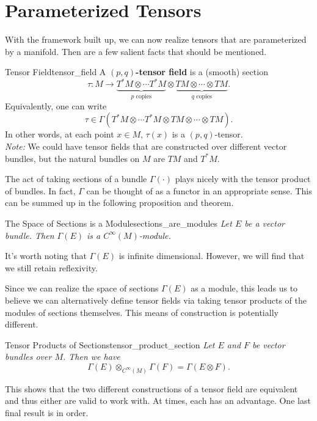 \section{Parameterized Tensors}

With the framework built up, we can now realize tensors that are parameterized by a manifold.  Then are a few salient facts that should be mentioned.

\begin{df}{Tensor Field}{tensor_field}
A \textbf{$(p,q)$-tensor field} is a (smooth) section
\[
\tau \colon M \to \underbrace{T^*M\otimes \cdots T^*M}_{\textrm{$p$ copies}} \otimes \underbrace{TM\otimes \cdots \otimes TM}_{\textrm{$q$ copies}}.
\]
Equivalently, one can write
\[
\tau \in \Gamma(T^*M\otimes \cdots T^*M\otimes TM \otimes \cdots \otimes TM).
\]
In other words, at each point $x\in M$, $\tau(x)$ is a $(p,q)$-tensor.\\

\emph{Note:} We could have tensor fields that are constructed over different vector bundles, but the natural bundles on $M$ are $TM$ and $T^*M$.
\end{df}

The act of taking sections of a bundle $\Gamma(\cdot)$ plays nicely with the tensor product of bundles.  In fact, $\Gamma$ can be thought of as a functor in an appropriate sense.  This can be summed up in the following proposition and theorem. 

\begin{prop}{The Space of Sections is a Module}{sections_are_modules}
\emph{Let $E$ be a vector bundle. Then $\Gamma(E)$ is a $C^\infty(M)$-module.}
\end{prop}

It's worth noting that $\Gamma(E)$ is infinite dimensional. However, we will find that we still retain reflexivity.

Since we can realize the space of sections $\Gamma(E)$ as a module, this leads us to believe we can alternatively define tensor fields via taking tensor products of the modules of sections themselves.  This means of construction is potentially different.

\begin{thm}{Tensor Products of Sections}{tensor_product_section}
\emph{Let $E$ and $F$ be vector bundles over $M$.  Then we have}
\[
\Gamma(E)\otimes_{C^\infty(M)}\Gamma(F) = \Gamma(E\otimes F).
\]
\end{thm}

This shows that the two different constructions of a tensor field are equivalent and thus either are valid to work with.  At times, each has an advantage.  One last final result is in order.

